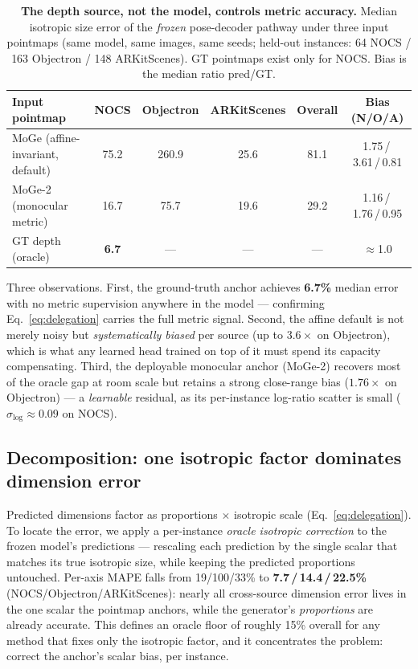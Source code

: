 \documentclass[runningheads]{llncs}
\begin{document}
\begin{table}[t]
\centering
\caption{\textbf{The depth source, not the model, controls metric accuracy.} Median
isotropic size error of the \emph{frozen} pose-decoder pathway under three input pointmaps
(same model, same images, same seeds; held-out instances: 64 NOCS / 163 Objectron /
148 ARKitScenes). GT pointmaps exist only for NOCS. Bias is the median ratio
pred/GT.}
\label{tab:oracle}
\setlength{\tabcolsep}{5pt}
\begin{tabular}{lcccc c}
\toprule
Input pointmap & NOCS & Objectron & ARKitScenes & Overall & Bias (N/O/A) \\
\midrule
MoGe (affine-invariant, default) & 75.2 & 260.9 & 25.6 & 81.1 & 1.75\,/\,3.61\,/\,0.81 \\
MoGe-2 (monocular metric)        & 16.7 & 75.7  & 19.6 & 29.2 & 1.16\,/\,1.76\,/\,0.95 \\
GT depth (oracle)                & \textbf{6.7} & --- & --- & --- & $\approx$1.0 \\
\bottomrule
\end{tabular}
\end{table}

Three observations. First, the ground-truth anchor achieves \textbf{6.7\%} median error with
no metric supervision anywhere in the model --- confirming Eq.~\ref{eq:delegation} carries the
full metric signal. Second, the affine default is not merely noisy but \emph{systematically
biased} per source (up to $3.6\times$ on Objectron), which is what any learned head trained
on top of it must spend its capacity compensating. Third, the deployable monocular anchor
(MoGe-2) recovers most of the oracle gap at room scale but retains a strong
close-range bias ($1.76\times$ on Objectron) --- a \emph{learnable} residual, as its
per-instance log-ratio scatter is small ($\sigma_{\log} \approx 0.09$ on NOCS).

\subsection{Decomposition: one isotropic factor dominates dimension error}
\label{sec:decomposition}

Predicted dimensions factor as proportions $\times$ isotropic scale
(Eq.~\ref{eq:delegation}). To locate the error, we apply a per-instance \emph{oracle
isotropic correction} to the frozen model's predictions --- rescaling each prediction by
the single scalar that matches its true isotropic size, while keeping the predicted
proportions untouched. Per-axis MAPE falls from 19/100/33\% to
\textbf{7.7\,/\,14.4\,/\,22.5\%} (NOCS/Objectron/ARKitScenes): nearly all cross-source
dimension error lives in the one scalar the pointmap anchors, while the generator's
\emph{proportions} are already accurate. This defines an oracle floor of roughly 15\%
overall for any method that fixes only the isotropic factor, and it concentrates the
problem: correct the anchor's scalar bias, per instance.
\end{document}
